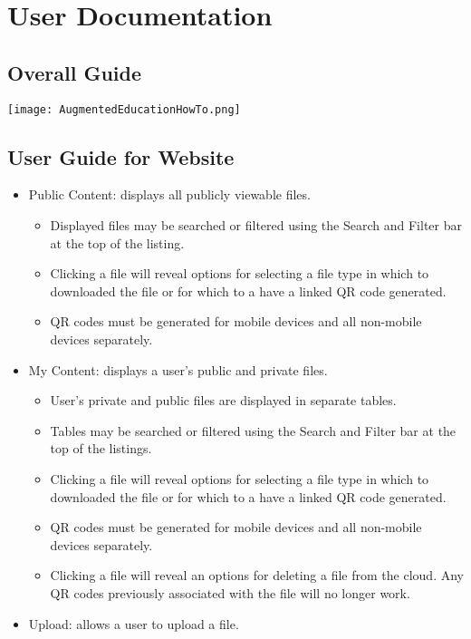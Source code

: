 

\chapter{User Documentation}

\section{Overall Guide}
\texttt{[image: AugmentedEducationHowTo.png]}

\section{User Guide for Website}
\begin{itemize}
    \item Public Content: displays all publicly viewable files.
    \begin{itemize}
        \item Displayed files may be searched or filtered using the Search and Filter bar at the top of the listing.
        \item Clicking a file will reveal options for selecting a file type in which to downloaded the file or for which to a have a linked QR code generated.
        \item QR codes must be generated for mobile devices and all non-mobile devices separately. 
    \end{itemize}
    \item My Content: displays a user's public and private files.
    \begin{itemize}
        \item User's private and public files are displayed in separate tables.  
        \item Tables may be searched or filtered using the Search and Filter bar at the top of the listings.
        \item Clicking a file will reveal options for selecting a file type in which to downloaded the file or for which to a have a linked QR code generated.
        \item QR codes must be generated for mobile devices and all non-mobile devices separately. 
        \item Clicking a file will reveal an options for deleting a file from the cloud. Any QR codes previously associated with the file will no longer work. 
    \end{itemize}
    \item Upload: allows a user to upload a file.

\end{itemize}

